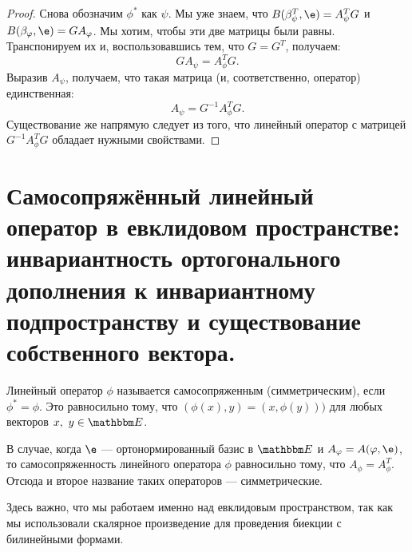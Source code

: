 \begin{proof}
Снова обозначим $\phi^*$ как $\psi$. Мы уже знаем, что $B(\beta_\psi^T, \e) = A_\psi^TG$ и $B(\beta_\phi, \e) \hm= GA_\phi$. Мы хотим, чтобы эти две матрицы были равны. Транспонируем их и, воспользовавшись тем, что $G = G^T$, получаем:
$$
GA_\psi = A_\phi^TG.
$$
Выразив $A_\psi$, получаем, что такая матрица (и, соответственно, оператор) единственная: 
$$A_\psi = G^{-1}A_\phi^TG.$$ 
Существование же напрямую следует из того, что линейный оператор с матрицей $G^{-1}A_\phi^TG$ обладает нужными свойствами.
\end{proof}

\section{Самосопряжённый линейный оператор в евклидовом пространстве: инвариантность ортогонального дополнения к инвариантному подпространству и  существование собственного вектора.}

\begin{Def}
Линейный оператор $\phi$ называется самосопряженным (симметрическим), если $\phi^* = \phi$. Это равносильно тому, что $(\phi(x), y) = (x, \phi(y)))$ для любых векторов $x,\ y \in \E$.
\end{Def}

\begin{Comment}
В случае, когда $\e$ --- ортонормированный базис в $\E$ и $A_\phi = A(\phi, \e)$, то самосопряженность линейного оператора $\phi$ равносильно тому, что $A_\phi = A_\phi^T$. Отсюда и второе название таких операторов --- симметрические. 
\end{Comment}

Здесь важно, что мы работаем  именно над евклидовым пространством, так как мы использовали скалярное произведение для проведения биекции с билинейными формами.

